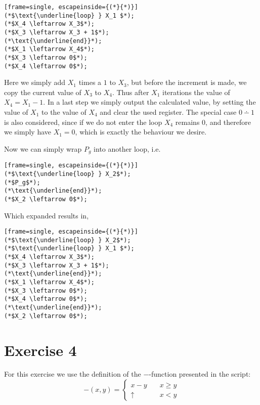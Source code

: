 \documentclass[11pt,a4paper]{article}
\begin{document}
\begin{lstlisting}[frame=single, escapeinside={(*}{*)}] 
(*$\text{\underline{loop} } X_1 $*);
(*$X_4 \leftarrow X_3$*);
(*$X_3 \leftarrow X_3 + 1$*);
(*\text{\underline{end}}*);
(*$X_1 \leftarrow X_4$*);
(*$X_3 \leftarrow 0$*);
(*$X_4 \leftarrow 0$*);
\end{lstlisting}

Here we simply add $X_1$ times a $1$ to $X_3$, but before the increment is made, we copy the current value of $X_3$ to $X_4$.
Thus after $X_1$ iterations the value of $X_4=X_1-1$. In a last step we simply output the calculated value, by setting the value of $X_1$ to the value of $X_4$ and clear the used register.
The special case $0 \dotminus 1$ is also considered, since if we do not enter the loop $X_4$ remains $0$, and therefore we simply have $X_1=0$,
which is exactly the behaviour we desire.

Now we can simply wrap $P_g$ into another loop, i.e.

\begin{lstlisting}[frame=single, escapeinside={(*}{*)}] 
(*$\text{\underline{loop} } X_2$*);
(*$P_g$*);
(*\text{\underline{end}}*);
(*$X_2 \leftarrow 0$*);
\end{lstlisting}

Which expanded results in,

\begin{lstlisting}[frame=single, escapeinside={(*}{*)}] 
(*$\text{\underline{loop} } X_2$*);
(*$\text{\underline{loop} } X_1 $*);
(*$X_4 \leftarrow X_3$*);
(*$X_3 \leftarrow X_3 + 1$*);
(*\text{\underline{end}}*);
(*$X_1 \leftarrow X_4$*);
(*$X_3 \leftarrow 0$*);
(*$X_4 \leftarrow 0$*);
(*\text{\underline{end}}*);
(*$X_2 \leftarrow 0$*);
\end{lstlisting}

\section*{Exercise 4}

For this exercise we use the definition of the $-$-function presented in the script:
\begin{equation*}
-(x,y)=
\begin{cases}
    x-y           & \quad x \geq y \\
    \uparrow  & \quad   x < y
\end{cases}
\end{equation*}
\end{document}
